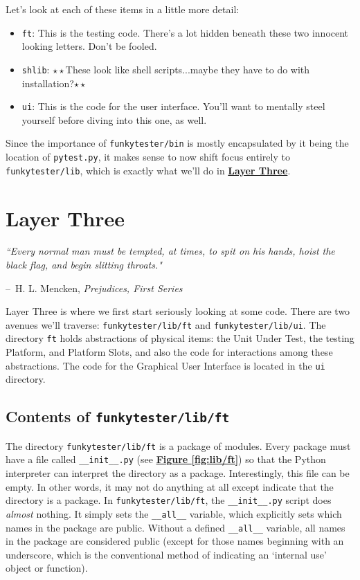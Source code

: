 \documentclass{report}
\makeatletter
\newenvironment{chapquote}[2][2em]
  {\setlength{\@tempdima}{#1}%
   \def\chapquote@author{#2}%
   \parshape 1 \@tempdima \dimexpr\textwidth-2\@tempdima\relax%
   \itshape}
  {\par\normalfont\hfill--\ \chapquote@author\hspace*{\@tempdima}\par\bigskip}
\newcommand{\dstar}{$\star\star$}	%
\makeatother
\begin{document}
Let's look at each of these items in a little more detail:
\begin{itemize}
	\item \texttt{ft}: This is the testing code. There's a lot hidden beneath these two innocent looking letters. Don't be fooled.
	\item \texttt{shlib}: \dstar These look like shell scripts...maybe they have to do with installation?\dstar
	\item \texttt{ui}: This is the code for the user interface. You'll want to mentally steel yourself before diving into this one, as well.
\end{itemize}

Since the importance of \texttt{funkytester/bin} is mostly encapsulated by it being the location of \texttt{pytest.py}, it makes sense to now shift focus entirely to \texttt{funkytester/lib}, which is exactly what we'll do in \hyperref[sec:layer3]{\textbf{Layer Three}}.

\section{Layer Three}	\label{sec:layer3}
\begin{chapquote}{H. L. Mencken, \textit{Prejudices, First Series}}
``Every normal man must be tempted, at times, to spit on his hands, hoist the black flag, and begin slitting throats."
\end{chapquote}

Layer Three is where we first start seriously looking at some code. There are two avenues we'll traverse: \texttt{funkytester/lib/ft} and \texttt{funkytester/lib/ui}. The directory \texttt{ft} holds abstractions of physical items: the Unit Under Test, the testing Platform, and Platform Slots, and also the code for interactions among these abstractions. The code for the Graphical User Interface is located in the \texttt{ui} directory.

\subsection{Contents of \texttt{funkytester/lib/ft}}
The directory \texttt{funkytester/lib/ft} is a package of modules. Every package must have a file called \texttt{\_\_init\_\_.py} (see \hyperref[fig:lib/ft]{\textbf{Figure \ref{fig:lib/ft}}}) so that the Python interpreter can interpret the directory as a package. Interestingly, this file can be empty. In other words, it may not do anything at all except indicate that the directory is a package. In \texttt{funkytester/lib/ft}, the \texttt{\_\_init\_\_.py} script does \textit{almost} nothing. It simply sets the \texttt{\_\_all\_\_} variable, which explicitly sets which names in the package are public. Without a defined \texttt{\_\_all\_\_} variable, all names in the package are considered public (except for those names beginning with an underscore, which is the conventional method of indicating an `internal use' object or function).
\end{document}
